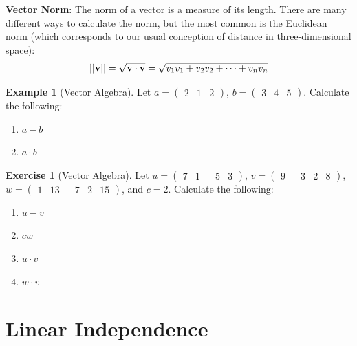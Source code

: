 \documentclass[
]{book}
\theoremstyle{definition}
\theoremstyle{definition}
\newtheorem{example}{Example}[chapter]
\theoremstyle{definition}
\newtheorem{exercise}{Exercise}[chapter]
\theoremstyle{definition}
\theoremstyle{remark}
\begin{document}
\textbf{Vector Norm}: The norm of a vector is a measure of its length. There are many different ways to calculate the norm, but the most common is the Euclidean norm (which corresponds to our usual conception of distance in three-dimensional space):
\[ ||{\bf v}|| = \sqrt{{\bf v}\cdot{\bf v}} = \sqrt{ v_1v_1 + v_2v_2 + \cdots + v_nv_n}\]

\begin{example}[Vector Algebra]
\protect\hypertarget{exm:vectors}{}{\label{exm:vectors} {} }
Let \(a = \begin{pmatrix} 2&1&2\end{pmatrix}\), \(b = \begin{pmatrix} 3&4&5 \end{pmatrix}\). Calculate the following:

\begin{enumerate}
\def\labelenumi{\arabic{enumi}.}
\item
  \(a - b\)
\item
  \(a \cdot b\)
\end{enumerate}
\end{example}

\begin{exercise}[Vector Algebra]
\protect\hypertarget{exr:vectors1}{}{\label{exr:vectors1} {} }
Let \(u = \begin{pmatrix} 7&1&-5&3\end{pmatrix}\), \(v = \begin{pmatrix} 9&-3&2&8 \end{pmatrix}\), \(w = \begin{pmatrix} 1&13& -7&2 &15 \end{pmatrix}\), and \(c = 2\). Calculate the following:

\begin{enumerate}
\def\labelenumi{\arabic{enumi}.}
\item
  \(u-v\)
\item
  \(cw\)
\item
  \(u \cdot v\)
\item
  \(w \cdot v\)
\end{enumerate}
\end{exercise}

\hypertarget{linearindependence}{%
\section{Linear Independence}\label{linearindependence}}
\end{document}

